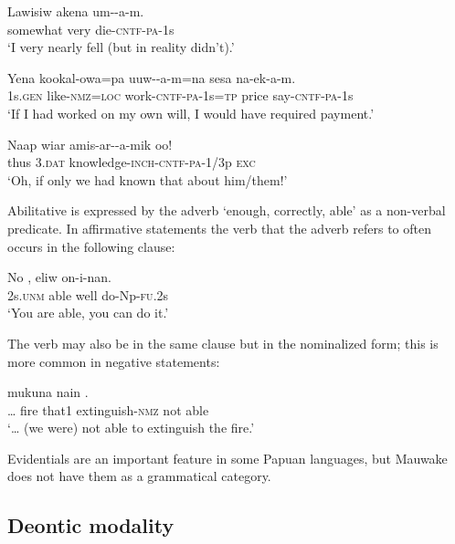 \ea%
\label{ex:6:x1054}
\gll Lawisiw  akena  um--a-m. \\
somewhat  very  die-\textsc{cntf}-\textsc{pa}-1s\\
\glt `I very nearly fell (but in reality didn't).'
\z

\ea%
\label{ex:6:x1055}
\gll Yena  kookal-owa=pa  uuw--a-m=na  sesa  na-ek-a-m. \\
1s.\textsc{gen}  like-\textsc{nmz}=\textsc{loc}  work-\textsc{cntf}-\textsc{pa}-1s=\textsc{tp}  price  say-\textsc{cntf}-\textsc{pa}-1s\\
\glt `If I had worked on my own will, I would have required payment.'
\z

\ea%
\label{ex:6:x1056}
\gll Naap  wiar  amis-ar--a-mik  oo! \\
thus  3.\textsc{dat}  knowledge-\textsc{inch}-\textsc{cntf}-\textsc{pa}-1/3p  \textsc{exc}\\
\glt `Oh, if only we had known that about him/them!'
\z

Abilitative is expressed by the adverb  `enough, correctly, able' as a non-verbal predicate. In affirmative statements the verb that the adverb refers to often occurs in the following clause:

\ea%
\label{ex:6:x1089}
\gll No  ,  eliw  on-i-nan. \\
2s.\textsc{unm}  able  well  do-Np-\textsc{fu}.2s\\
\glt `You are able, you can do it.'
\z

The verb may also be in the same clause but in the nominalized form; this is more common in negative statements:

\ea%
\label{ex:6:x1088}
\gll {\dots} mukuna  nain    . \\
{\dots} fire that1  extinguish-\textsc{nmz} not  able\\
\glt `{\dots} (we were) not able to extinguish the fire.'
\z

Evidentials are an important feature in some Papuan languages, but Mauwake does not have them as a grammatical category.

\subsection{Deontic modality} \label{sec:6.1.2}


